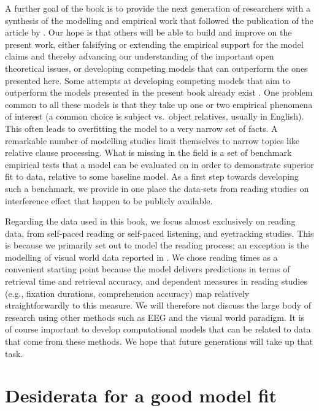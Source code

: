 \documentclass{cambridge7A}\usepackage[]{graphicx}\usepackage[]{color}
\begin{document}
A further goal of the book is to provide the next generation of
researchers with a synthesis of the modelling and empirical work that
followed the publication of the article by
\cite{LewisVasishth2005}. Our hope is that others will be able to
build and improve on the present work, either falsifying or extending
the empirical support for the model claims and thereby advancing our
understanding of the important open theoretical issues, or developing
competing models that can outperform the ones presented here.  Some 
attempts at developing competing models that aim to outperform the
models presented in the present book already exist
\citep{SmithFranckTaborCogSci2018,rasmussen2017left,cho2017incremental,parker2019cue}. One
problem common to all these models is that they take up one or two
empirical phenomena of interest (a common choice is subject vs.\
object relatives, usually in English). This often leads to overfitting
the model to a very narrow set of facts. A remarkable number of
modelling studies limit themselves to narrow topics like relative clause processing.  What is missing in the field is a set of 
benchmark empirical tests that a model can be evaluated on in order to demonstrate superior fit to data, relative to some baseline model. As a first step towards developing such a benchmark, we provide in one place the data-sets from reading studies on interference effect that happen to be publicly available.

Regarding the data used in this book, we focus almost exclusively on reading data, from  self-paced reading or  self-paced listening, and  eyetracking studies. This is because we primarily set out to model the reading process;  an exception is the modelling of visual world data reported in  \cite{PatilEtAl2016}.
We chose reading times as a convenient starting point because the \cite{LewisVasishth2005} model delivers predictions in terms of retrieval time and retrieval accuracy, and dependent measures in reading studies (e.g., fixation durations, comprehension accuracy) map relatively straightforwardly to this measure.  We will therefore not discuss the large body of research using other methods such as EEG and the visual world paradigm.  It is of course important to develop computational models that can be related to data that come from these methods. We hope
that future generations will take up that task.

\section{Desiderata for a good model fit}
\end{document}
